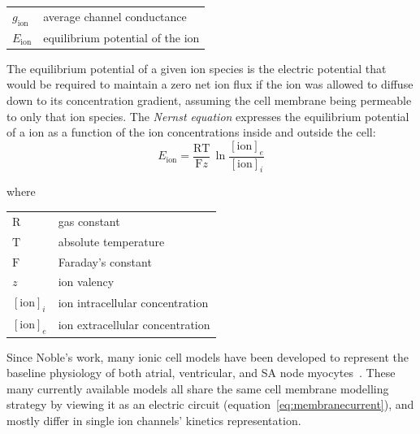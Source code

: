 \vspace{0.2cm}
\begin{tabular}{ll}
    $g_{\textrm{ion}}$ & average channel conductance \\
    $E_\textrm{ion}$ & equilibrium potential of the ion
\end{tabular}

\vspace{0.2cm}\noindent
The equilibrium potential of a given ion species is the electric potential that would be required to maintain a zero net ion flux if the ion was allowed to diffuse down to its concentration gradient, assuming the cell membrane being permeable to only that ion species. The \textit{Nernst equation} expresses the equilibrium potential of a ion as a function of the ion concentrations inside and outside the cell:
%
\begin{equation}
    E_{\textrm{ion}}=\frac{\textrm{R}\textrm{T}}{\textrm{F}z}\,\ln{\frac{[\textrm{ion}]_{e}}{[\textrm{ion}]_{i}}}
\end{equation}

\noindent
where

\vspace{0.2cm}
\begin{tabular}{ll}
    $\textrm{R}$  & gas constant \\
    $\textrm{T}$  & absolute temperature \\
    $\textrm{F}$  & Faraday's constant \\
    $z$           & ion valency \\
    $[\textrm{ion}]_{i}$  & ion intracellular concentration \\
    $[\textrm{ion}]_{e}$  & ion extracellular concentration \\
\end{tabular}

\vspace{0.4cm}
Since Noble's work, many ionic cell models have been developed to represent the baseline physiology of both atrial, ventricular, and SA node myocytes~\cite{Corrado:2020}. These many currently available models all share the same cell membrane modelling strategy by viewing it as an electric circuit (equation~\eqref{eq:membranecurrent}), and mostly differ in single ion channels' kinetics representation.

